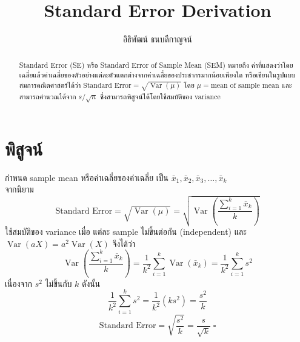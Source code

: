 \documentclass[a4paper, 12pt]{article}
\DeclareMathOperator{\Var}{Var}
\begin{document}
\title{Standard Error Derivation}
\author{อิธิพัฒน์ ธนบดีกาญจน์}

\maketitle

\begin{abstract}
	Standard Error (SE) หรือ Standard Error of Sample Mean (SEM) หมายถึง ค่าที่แสดงว่าโดยเฉลี่ยแล้วค่าเฉลี่ยของตัวอย่างแต่ละตัวแตกต่างจากค่าเฉลี่ยของประชากรมากน้อยเพียงใด หรือเขียนในรูปแบบสมการคณิตศาสตร์ได้ว่า \(\text{Standard Error} = \sqrt{\Var(\mu)}\) โดย \(\mu = \text{mean of sample mean}\) และสามารถคำนวณได้จาก \(s/\sqrt{n}\) ซึ่งสามารถพิสูจน์ได้โดยใช้สมบัติของ variance
\end{abstract}
\section{พิสูจน์}
กำหนด sample mean หรือค่าเฉลี่ยของค่าเฉลี่ย เป็น \(\bar{x}_1, \bar{x}_2, \bar{x}_3,\dots, \bar{x}_k\)\\
จากนิยาม
\begin{equation}
	\text{Standard Error} = \sqrt{\Var(\mu)} = \sqrt{\Var\left(\frac{\sum_{i=1}^{k}\bar{x}_k}{k}\right)}
\end{equation}
ใช้สมบัติของ variance เมื่อ แต่ละ sample ไม่ขึ้นต่อกัน (independent) และ \(\Var(aX) = a^2\Var(X)\) จึงได้ว่า
\begin{equation*}
	\Var\left(\frac{\sum_{i=1}^{k}\bar{x}_k}{k}\right)=\frac{1}{k^2}\sum_{i=1}^{k}\Var(\bar{x}_k)=\frac{1}{k^2}\sum_{i=1}^{k}s^2
\end{equation*}
เนื่องจาก \(s^2\) ไม่ขึ้นกับ \(k\) ดังนั้น
\begin{equation*}
	\frac{1}{k^2}\sum_{i=1}^{k}s^2=\frac{1}{k^2}(ks^2)=\frac{s^2}{k}
\end{equation*}
\begin{equation}
	\text{Standard Error} = \sqrt{\frac{s^2}{k}} = \frac{s}{\sqrt{k}}\;\square
\end{equation}
\end{document}
